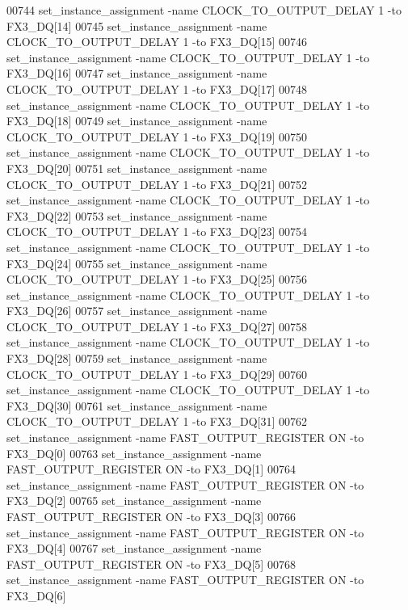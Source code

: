 \begin{DoxyCode}
00744 set\_instance\_assignment -name CLOCK\_TO\_OUTPUT\_DELAY \textcolor{vhdllogic}{1} -to FX3\_DQ[14]
00745 set\_instance\_assignment -name CLOCK\_TO\_OUTPUT\_DELAY \textcolor{vhdllogic}{1} -to FX3\_DQ[15]
00746 set\_instance\_assignment -name CLOCK\_TO\_OUTPUT\_DELAY \textcolor{vhdllogic}{1} -to FX3\_DQ[16]
00747 set\_instance\_assignment -name CLOCK\_TO\_OUTPUT\_DELAY \textcolor{vhdllogic}{1} -to FX3\_DQ[17]
00748 set\_instance\_assignment -name CLOCK\_TO\_OUTPUT\_DELAY \textcolor{vhdllogic}{1} -to FX3\_DQ[18]
00749 set\_instance\_assignment -name CLOCK\_TO\_OUTPUT\_DELAY \textcolor{vhdllogic}{1} -to FX3\_DQ[19]
00750 set\_instance\_assignment -name CLOCK\_TO\_OUTPUT\_DELAY \textcolor{vhdllogic}{1} -to FX3\_DQ[20]
00751 set\_instance\_assignment -name CLOCK\_TO\_OUTPUT\_DELAY \textcolor{vhdllogic}{1} -to FX3\_DQ[21]
00752 set\_instance\_assignment -name CLOCK\_TO\_OUTPUT\_DELAY \textcolor{vhdllogic}{1} -to FX3\_DQ[22]
00753 set\_instance\_assignment -name CLOCK\_TO\_OUTPUT\_DELAY \textcolor{vhdllogic}{1} -to FX3\_DQ[23]
00754 set\_instance\_assignment -name CLOCK\_TO\_OUTPUT\_DELAY \textcolor{vhdllogic}{1} -to FX3\_DQ[24]
00755 set\_instance\_assignment -name CLOCK\_TO\_OUTPUT\_DELAY \textcolor{vhdllogic}{1} -to FX3\_DQ[25]
00756 set\_instance\_assignment -name CLOCK\_TO\_OUTPUT\_DELAY \textcolor{vhdllogic}{1} -to FX3\_DQ[26]
00757 set\_instance\_assignment -name CLOCK\_TO\_OUTPUT\_DELAY \textcolor{vhdllogic}{1} -to FX3\_DQ[27]
00758 set\_instance\_assignment -name CLOCK\_TO\_OUTPUT\_DELAY \textcolor{vhdllogic}{1} -to FX3\_DQ[28]
00759 set\_instance\_assignment -name CLOCK\_TO\_OUTPUT\_DELAY \textcolor{vhdllogic}{1} -to FX3\_DQ[29]
00760 set\_instance\_assignment -name CLOCK\_TO\_OUTPUT\_DELAY \textcolor{vhdllogic}{1} -to FX3\_DQ[30]
00761 set\_instance\_assignment -name CLOCK\_TO\_OUTPUT\_DELAY \textcolor{vhdllogic}{1} -to FX3\_DQ[31]
00762 set\_instance\_assignment -name FAST\_OUTPUT\_REGISTER \textcolor{keywordflow}{ON} -to FX3\_DQ[0]
00763 set\_instance\_assignment -name FAST\_OUTPUT\_REGISTER \textcolor{keywordflow}{ON} -to FX3\_DQ[1]
00764 set\_instance\_assignment -name FAST\_OUTPUT\_REGISTER \textcolor{keywordflow}{ON} -to FX3\_DQ[2]
00765 set\_instance\_assignment -name FAST\_OUTPUT\_REGISTER \textcolor{keywordflow}{ON} -to FX3\_DQ[3]
00766 set\_instance\_assignment -name FAST\_OUTPUT\_REGISTER \textcolor{keywordflow}{ON} -to FX3\_DQ[4]
00767 set\_instance\_assignment -name FAST\_OUTPUT\_REGISTER \textcolor{keywordflow}{ON} -to FX3\_DQ[5]
00768 set\_instance\_assignment -name FAST\_OUTPUT\_REGISTER \textcolor{keywordflow}{ON} -to FX3\_DQ[6]

\end{DoxyCode}
